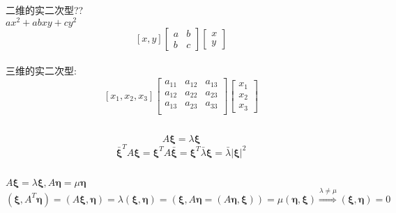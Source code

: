 \documentclass[11pt, a4paper, UTF8]{ctexart}
\begin{document}
\section{}
\subsection{}
二维的实二次型??\\
$ax^2+abxy+cy^2$\\
\[[x,y]\begin{bmatrix}
a&b\\
b&c
\end{bmatrix}\begin{bmatrix}
x\\
y
\end{bmatrix}\]\\
三维的实二次型:\\
\[[x_1,x_2,x_3]\begin{bmatrix}
a_{11}&a_{12}&a_{13}\\
a_{12}&a_{22}&a_{23}\\
a_{13}&a_{23}&a_{33}\\
\end{bmatrix}\begin{bmatrix}
x_1\\
x_2\\
x_3
\end{bmatrix}\]
\subsection{}
\[A\bm\xi=\lambda\bm\xi\]
\[\bar{\bm\xi}^TA\bm\xi=\bm\xi^TA\bar{\bm\xi}=\bm\xi^T\bar{\lambda}\bm\xi=\bar\lambda|\bm\xi|^2\]
\subsection{}
$A\bm\xi=\lambda\bm\xi,A\bm\eta=\mu\bm\eta$\\
$(\bm\xi,A^T\bm\eta)=(A\bm\xi,\bm\eta)=\lambda(\bm\xi,\bm\eta)=(\bm\xi,A\bm\eta=(A\bm\eta,\bm\xi))=\mu(\bm\eta,\bm\xi)\overset{\lambda\not=\mu}{\Rightarrow}(\bm\xi,\bm\eta)=0$\\
\section{}
\subsection{}
\end{document}
